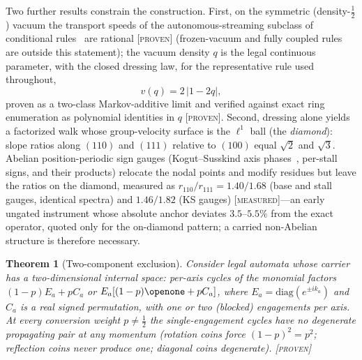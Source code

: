 \documentclass[aps,prd,twocolumn,superscriptaddress,nofootinbib,floatfix]{revtex4-2}
\newtheorem{theorem}{Theorem}
\newcommand{\evP}{\textnormal{\textsc{[proven]}}}
\newcommand{\evX}{\textnormal{\textsc{[measured]}}}
\begin{document}
Two further results constrain the construction. First, on the symmetric
(density-$\tfrac12$) vacuum the transport speeds of the
autonomous-streaming subclass of conditional rules~\cite{Wetterich2022b}
are rational \evP{} (frozen-vacuum and fully coupled rules are outside
this statement); the vacuum density $q$ is
the legal continuous parameter, with the closed dressing law, for the
representative rule used throughout,
\begin{equation}
v(q) = 2\,|1-2q| ,
\label{eq:vq}
\end{equation}
proven as a two-class Markov-additive limit and verified against exact ring
enumeration as polynomial identities in $q$ \evP{}. Second, dressing alone
yields a factorized walk whose group-velocity surface is the $\ell^1$ ball
(the \emph{diamond}): slope ratios along $(110)$ and $(111)$ relative to
$(100)$ equal $\sqrt2$ and $\sqrt3$. Abelian position-periodic sign gauges
(Kogut--Susskind axis phases~\cite{KogutSusskind,Susskind}, per-stall signs, and
their products) relocate the nodal points and modify residues but leave the
ratios on the diamond, measured as
$r_{110}/r_{111}=1.40/1.68$ (base and stall gauges, identical spectra) and
$1.46/1.82$ (KS gauges) \evX{}---an early ungated instrument whose absolute
anchor deviates $3.5$--$5.5\%$ from the exact operator, quoted only for the
on-diamond pattern; a carried non-Abelian structure is therefore necessary.

\begin{theorem}[Two-component exclusion]\label{thm:ntwo}
Consider legal automata whose carrier has a two-dimensional internal
space: per-axis cycles of the monomial factors $(1-p)E_a+pC_a$ or
$E_a[(1-p)\openone+pC_a]$, where $E_a=\mathrm{diag}(e^{\pm ik_a})$ and
$C_a$ is a real signed permutation, with one or two (blocked)
engagements per axis.
At every conversion weight $p\neq\tfrac12$ the single-engagement
cycles have no degenerate propagating pair at any momentum (rotation
coins force $(1-p)^2=p^2$; reflection coins never produce one; diagonal
coins degenerate). \evP{}
\end{theorem}
\end{document}
